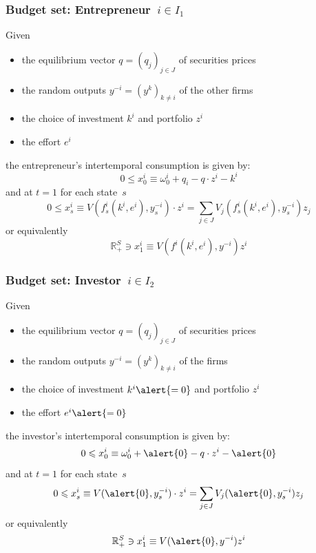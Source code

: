 \documentclass[blue]{beamer}
\def\R{\mathbb{R}}
\def\leq{\leqslant}
\theoremstyle{definition}
\theoremstyle{example}
\begin{document}

\begin{frame}\frametitle{Budget set: Entrepreneur~$i \in I_1$}

Given
\begin{itemize}
\item the equilibrium vector $q=(q_j)_{j\in J}$ of securities prices
\item the random outputs $y^{-i}=(y^k)_{k\neq i}$ of the other firms
\item the choice of investment $k^i$ and portfolio $z^i$
\item the effort $e^i$
\end{itemize}
the entrepreneur's intertemporal consumption is given by:
\[
0 \leq x^i_0 \equiv \omega^i_0 + q_i - q \cdot z^i - k^i
\]
and at $t=1$ for each state~$s$
\[
0 \leq x^i_s \equiv V(f^i_s(k^i,e^i),y^{-i}_s) \cdot z^i = \sum_{j \in J} V_j(f^i_s(k^i,e^i),y^{-i}_s) z_j
\]
or equivalently
\[
\R^S_+ \ni x^i_1 \equiv V(f^i(k^i,e^i),y^{-i}) z^i
\]

\end{frame}


\begin{frame}\frametitle{Budget set: Investor~$i \in I_2$}

Given
\begin{itemize}
\item the equilibrium vector $q=(q_j)_{j\in J}$ of securities prices
\item the random outputs $y^{-i}=(y^k)_{k\neq i}$ of the firms
\item the choice of investment $k^i\alert{=0}$ and portfolio $z^i$
\item the effort $e^i\alert{=0}$
\end{itemize}
the investor's intertemporal consumption is given by:
\[
0 \leq x^i_0 \equiv \omega^i_0 + \alert{0} - q \cdot z^i - \alert{0}
\]
and at $t=1$ for each state~$s$
\[
0 \leq x^i_s \equiv V(\alert{0},y^{-i}_s) \cdot z^i = \sum_{j \in J} V_j(\alert{0},y^{-i}_s) z_j
\]
or equivalently
\[
\R^S_+ \ni x^i_1 \equiv V(\alert{0},y^{-i}) z^i
\]

\end{frame}

\end{document}
